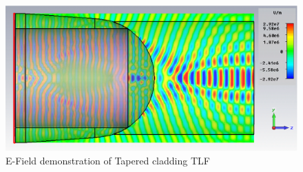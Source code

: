 \begin{figure}[!ht]
	\centering
		\includegraphics[width=0.8 \textwidth]{bilder/cst_lensed_fiber_equ_efield}
		\caption{E-Field demonstration of Tapered cladding TLF}
 		\label{fig:Tapered_cladding_efield}
\end{figure}

